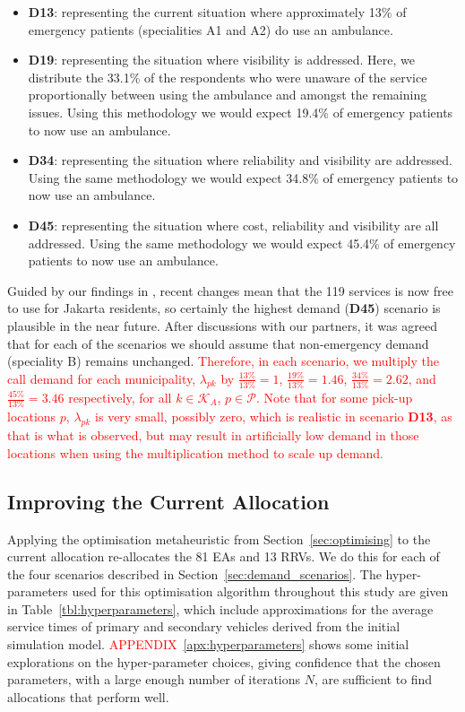 \documentclass[numbers,webpdf,imaman]{ima-authoring-template}%
\begin{document}
\begin{itemize}
  \item \textbf{D13}: representing the current situation where approximately
        13\% of emergency patients (specialities A1 and A2) do use an ambulance.
  \item \textbf{D19}: representing the situation where visibility is addressed.
        Here, we distribute the 33.1\% of the respondents who were unaware of
        the service proportionally between using the ambulance and amongst the
        remaining issues. Using this methodology we would expect 19.4\% of
        emergency patients to now use an ambulance.  
  \item \textbf{D34}: representing the situation where reliability and
        visibility are addressed. Using the same methodology we would expect
        34.8\% of emergency patients to now use an ambulance.
  \item \textbf{D45}: representing the situation where cost, reliability and
        visibility are all addressed. Using the same methodology we would expect
        45.4\% of emergency patients to now use an ambulance. 
\end{itemize}

Guided by our findings in \citet{BriceSyaribahNoor2022Esui}, recent changes
mean that the 119 services is now free to use for Jakarta residents, so
certainly the highest demand (\textbf{D45}) scenario is plausible in the near
future. After discussions with our partners, it was agreed that for each of
the scenarios we should assume that non-emergency demand (speciality B)
remains unchanged.
\textcolor{red}{Therefore, in each scenario, we multiply the call demand for
each municipality, $\lambda_{pk}$ by $\frac{13\%}{13\%}=1$,
$\frac{19\%}{13\%}=1.46$, $\frac{34\%}{13\%}=2.62$, and
$\frac{45\%}{13\%}=3.46$ respectively, for all $k \in \mathcal{K}_A$,
$p \in \mathcal{P}$. Note that for some pick-up locations $p$, $\lambda_{pk}$
is very small, possibly zero, which is realistic in scenario \textbf{D13}, as
that is what is observed, but may result in artificially low demand in those
locations when using the multiplication method to scale up demand.}

\subsection{Improving the Current Allocation}\label{sec:optimise_current}
Applying the optimisation metaheuristic from Section~\ref{sec:optimising} to the
current allocation re-allocates the 81 EAs and 13 RRVs. We do this for each of
the four scenarios described in Section~\ref{sec:demand_scenarios}. The
hyper-parameters used for this optimisation algorithm throughout this study are
given in Table~\ref{tbl:hyperparameters}, which include approximations for the
average service times of primary and secondary vehicles derived from the initial
simulation model. \textcolor{red}{APPENDIX}~\ref{apx:hyperparameters} shows some initial explorations on
the hyper-parameter choices, giving confidence that the chosen parameters, with
a large enough number of iterations $N$, are sufficient to find allocations
that perform well.
\end{document}
